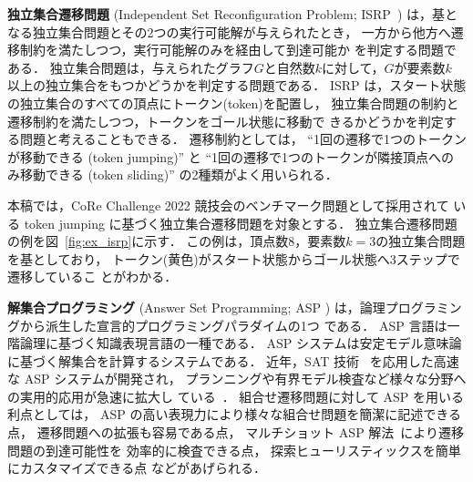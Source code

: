 \textbf{独立集合遷移問題}
(Independent Set Reconfiguration Problem; ISRP~\cite{core:ItoDHPSUU11})
は，基となる独立集合問題とその2つの実行可能解が与えられたとき，
一方から他方へ遷移制約を満たしつつ，実行可能解のみを経由して到達可能か
を判定する問題である．
独立集合問題は，与えられたグラフ$G$と自然数$k$に対して，$G$が要素数$k$
以上の独立集合をもつかどうかを判定する問題である．
ISRP は，スタート状態の独立集合のすべての頂点にトークン(token)を配置し，
独立集合問題の制約と遷移制約を満たしつつ，トークンをゴール状態に移動で
きるかどうかを判定する問題と考えることもできる．
遷移制約としては，
``1回の遷移で1つのトークンが移動できる (token jumping)''  と
``1回の遷移で1つのトークンが隣接頂点へのみ移動できる (token sliding)'' 
の2種類がよく用いられる．

本稿では，CoRe Challenge 2022 競技会のベンチマーク問題として採用されて
いる token jumping に基づく独立集合遷移問題を対象とする．
独立集合遷移問題の例を図~\ref{fig:ex_isrp}に示す．
この例は，頂点数8，要素数$k=3$の独立集合問題を基としており，
トークン(黄色)がスタート状態からゴール状態へ3ステップで遷移しているこ
とがわかる．

\textbf{解集合プログラミング}
(Answer Set Programming; ASP \cite{%
  Gelfond88:iclp,
  Niemela99:amai,
  Baral03:cambridge,
  Inoue08:jssst})
は，論理プログラミングから派生した宣言的プログラミングパラダイムの1つ
である．
ASP 言語は一階論理に基づく知識表現言語の一種である．
ASP システムは安定モデル意味論に基づく解集合を計算するシステムである．
近年，SAT 技術~\cite{Knuth:TAOCP:SAT}
を応用した高速な ASP システムが開発され，
プランニングや有界モデル検査など様々な分野への実用的応用が急速に拡大し
ている~\cite{Erdem16:AI}．
%
組合せ遷移問題に対して ASP を用いる利点としては，
ASP の高い表現力により様々な組合せ問題を簡潔に記述できる点，
遷移問題への拡張も容易である点，
マルチショット ASP 解法~\cite{GebserKKS19}により遷移問題の到達可能性を
効率的に検査できる点，
探索ヒューリスティックスを簡単にカスタマイズできる点
などがあげられる．

